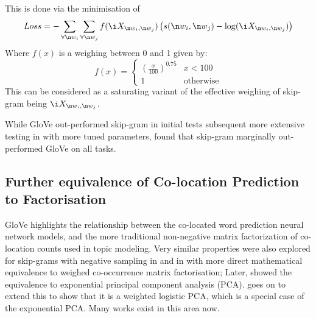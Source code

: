 {This is done via the minimisation of 
\begin{equation}
Loss = - \sum_{\forall \n w_i}  \sum_{\forall \n w_j} f(\i X_{\n w_i, \n w_j}) \left(s(\n w_i, \n w_j) -\log (\i X_{\n w_i, \n w_j})\right)
\end{equation}
Where $f(x)$ is a weighing between 0 and 1 given by:
\begin{equation}
f(x)=\begin{cases}
\left(\frac{x}{100}\right)^{0.75} & x<100\\
1 & \text{otherwise}
\end{cases}
\end{equation}
This can be considered as a saturating variant of the effective weighing of skip-gram being $\i X_{\n w_i, \n w_j}$.


While GloVe out-performed  skip-gram in initial tests subsequent more extensive testing in  with more tuned parameters,
found that skip-gram marginally out-performed GloVe on all tasks.





\subsection{Further equivalence of  Co-location Prediction to Factorisation}

GloVe highlights the relationship between the co-located word prediction neural network models,
and the more traditional non-negative matrix factorization of co-location counts used in topic modeling.
Very similar properties were also explored for skip-grams with negative sampling in  and in  with more direct mathematical equivalence to weighed co-occurrence matrix factorisation;
Later,   showed the equivalence to exponential principal component analysis (PCA).
 goes on to extend this to show that it is a weighted logistic PCA, which is a special case of the exponential PCA.
Many works exist in this area now.


}
